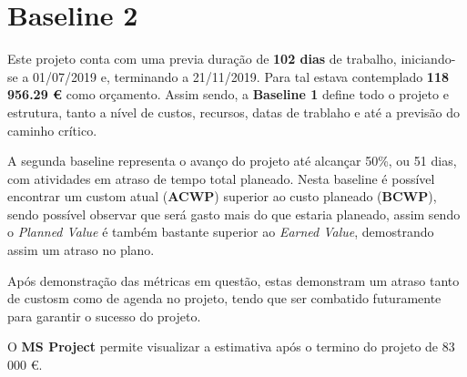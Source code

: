 \section{Baseline 2}

Este projeto conta com uma previa duração de \textbf{102 dias} de trabalho, iniciando-se a 01/07/2019 e, terminando a 21/11/2019. Para tal estava contemplado \textbf{118 956.29 \euro} como orçamento. Assim sendo, a \textbf{Baseline 1} define todo o projeto e estrutura, tanto a nível de custos, recursos, datas de trablaho e até a previsão do caminho crítico.

A segunda baseline representa o avanço do projeto até alcançar 50\%, ou 51 dias, com atividades em atraso de tempo total planeado. Nesta baseline é possível encontrar um custom atual (\textbf{ACWP}) superior ao custo planeado (\textbf{BCWP}), sendo possível observar que será gasto mais do que estaria planeado, assim sendo o \textit{Planned Value} é também bastante superior ao \textit{Earned Value}, demostrando assim um atraso no plano.

Após demonstração das métricas em questão, estas demonstram um atraso tanto de custosm como de agenda no projeto, tendo que ser combatido futuramente para garantir o sucesso do projeto.

O \textbf{MS Project} permite visualizar a estimativa após o termino do projeto de 83 000 \euro.
